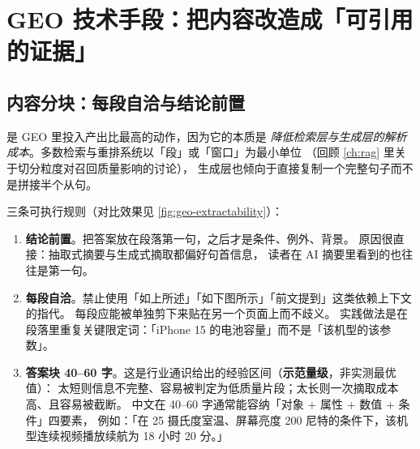 \section{GEO 技术手段：把内容改造成「可引用的证据」}

\subsection{内容分块：每段自洽与结论前置}

是 GEO 里投入产出比最高的动作，因为它的本质是
\emph{降低检索层与生成层的解析成本}。多数检索与重排系统以「段」或「窗口」为最小单位
（回顾 \cref{ch:rag} 里关于切分粒度对召回质量影响的讨论），
生成层也倾向于直接复制一个完整句子而不是拼接半个从句。

三条可执行规则（对比效果见 \cref{fig:geo-extractability}）：

\begin{enumerate}
  \item \textbf{结论前置}。把答案放在段落第一句，之后才是条件、例外、背景。
        原因很直接：抽取式摘要与生成式摘取都偏好句首信息，
        读者在 AI 摘要里看到的也往往是第一句。
  \item \textbf{每段自洽}。禁止使用「如上所述」「如下图所示」「前文提到」这类依赖上下文的指代。
        每段应能被单独剪下来贴在另一个页面上而不歧义。
        实践做法是在段落里重复关键限定词：「iPhone 15 的电池容量」而不是「该机型的该参数」。
  \item \textbf{答案块 40--60 字}。这是行业通识给出的经验区间（\textbf{示范量级}，非实测最优值）：
        太短则信息不完整、容易被判定为低质量片段；太长则一次摘取成本高、且容易被截断。
        中文在 40--60 字通常能容纳「对象 + 属性 + 数值 + 条件」四要素，
        例如：「在 25 摄氏度室温、屏幕亮度 200 尼特的条件下，该机型连续视频播放续航为 18 小时 20 分。」
\end{enumerate}

